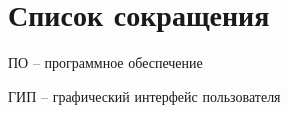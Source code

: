 \chapter*{Список сокращения}

ПО -- программное обеспечение

ГИП -- графический интерфейс пользователя
